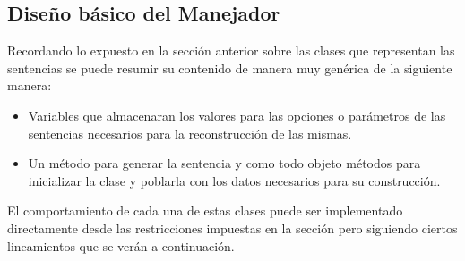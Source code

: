 \subsection{Diseño básico del Manejador}
Recordando lo expuesto en la sección anterior sobre las clases que representan las sentencias se puede resumir su contenido de manera muy genérica de la siguiente manera:
%
\begin{itemize}
\item Variables que almacenaran los valores para las opciones o parámetros de las sentencias necesarios para la reconstrucción de las mismas.
%
\item Un método para generar la sentencia y como todo objeto métodos para inicializar la clase y poblarla con los datos necesarios para su construcción.
%
\end{itemize}
%
El comportamiento de cada una de estas clases puede ser implementado directamente desde las restricciones impuestas en la sección  pero siguiendo ciertos lineamientos que  se verán a continuación.

